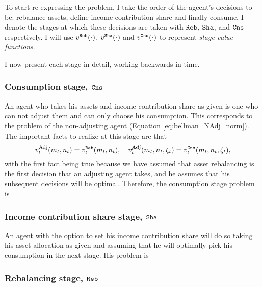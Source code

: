 \documentclass[./RiskyContrib.tex]{subfiles}
\begin{document}
To start re-expressing the problem, I take the order of the ageent's decisions to be:
rebalance assets, define income contribution share and finally consume. I denote the stages
at which these decisions are taken with $\mathtt{Reb}$, $\mathtt{Sha}$, and $\mathtt{Cns}$ respectively. I will use
$v^{\mathtt{Reb}}(\cdot)$, $v^{\mathtt{Sha}}(\cdot)$ and $v^{\mathtt{Cns}}(\cdot)$ to represent
\emph{stage value functions}.

I now present each stage in detail, working backwards in time.

\subsubsection{Consumption stage, $\mathtt{Cns}$}

An agent who takes his assets and income contribution share as given is one who
can not adjust them and can only choose his consumption. This corresponds to the
problem of the non-adjusting agent (Equation \ref{eq:bellman_NAdj_norm}). The
important facts to realize at this stage are that
\begin{equation*}
v_t^{\text{Adj}}(m_t, n_t) = v_t^{\mathtt{Reb}}(m_t, n_t), \quad v_t^{\cancel{\text{Adj}}}(m_t, n_t, \zeta_t) = v_t^{\mathtt{Cns}}(m_t, n_t, \zeta_t),
\end{equation*}
with the first fact being true because we have assumed that asset rebalancing
is the first decision that an adjusting agent takes, and he assumes that his
subsequent decisions will be optimal. Therefore, the consumption stage problem is
\begin{equation}\label{eq:bellman_cns}

\end{equation}

\subsubsection{Income contribution share stage, $\mathtt{Sha}$}

An agent with the option to set his income contribution share will do so
taking his asset allocation as given and assuming that he will optimally
pick his consumption in the next stage. His problem is
\begin{equation}\label{eq:bellman_sha}

\end{equation}

\subsubsection{Rebalancing stage, $\mathtt{Reb}$}
\end{document}
